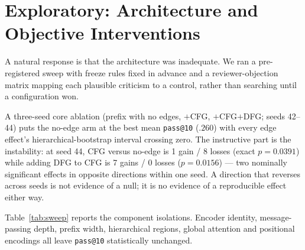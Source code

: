 \documentclass[conference]{IEEEtran}
\makeatletter
\newcommand{\passat}[1]{\texttt{pass@#1}\xspace}
\makeatother
\begin{document}
\section{Exploratory: Architecture and Objective Interventions}
\label{sec:arch}
A natural response is that the architecture was inadequate. We ran a
pre-registered sweep with freeze rules fixed in advance and a
reviewer-objection matrix mapping each plausible criticism to a control, rather
than searching until a configuration won.

A three-seed core ablation (prefix with no edges, $+$CFG, $+$CFG$+$DFG; seeds
42--44) puts the no-edge arm at the best mean \passat{10} ($.260$) with every
edge effect's hierarchical-bootstrap interval crossing zero. The instructive part
is the instability: at seed 44, CFG versus no-edge is 1 gain / 8 losses (exact
$p{=}0.0391$) while adding DFG to CFG is 7 gains / 0 losses ($p{=}0.0156$) --- two
nominally significant effects in opposite directions within one seed. A direction
that reverses across seeds is not evidence of a null; it is no evidence of a
reproducible effect either way.

Table~\ref{tab:sweep} reports the component isolations. Encoder identity,
message-passing depth, prefix width, hierarchical regions, global attention and
positional encodings all leave \passat{10} statistically unchanged.
\end{document}
